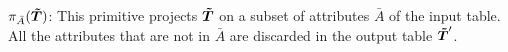     
 $\pi_{\bar{A}}(\boldsymbol{\tilde{T}})$: This primitive projects $\boldsymbol{\tilde{T}}$ on  a subset of attributes $\bar{A}$ of the input table. All the attributes that are not in $\bar{A}$ are discarded in the output table $\boldsymbol{\tilde{T}}'$.
	
   
